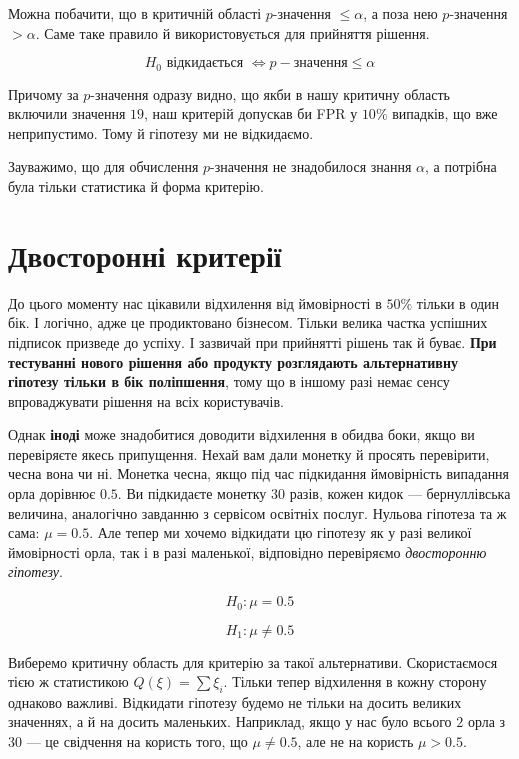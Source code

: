 \documentclass[
  letterpaper,
  10pt,
  openany]{report}
\theoremstyle{definition}
\theoremstyle{remark}
\begin{document}
Можна побачити, що в критичній області \(p\)-значення
\(\leqslant \alpha\), а поза нею \(p\)-значення \(> \alpha\). Саме таке
правило й використовується для прийняття рішення.

\[
H_0 \text{ відкидається } \Leftrightarrow p-значення \leqslant \alpha
\]

Причому за \(p\)-значення одразу видно, що якби в нашу критичну область
включили значення \(19\), наш критерій допускав би FPR у \(10\%\)
випадків, що вже неприпустимо. Тому й гіпотезу ми не відкидаємо.

Зауважимо, що для обчислення \(p\)-значення не знадобилося знання
\(\alpha\), а потрібна була тільки статистика й форма критерію.

\section{Двосторонні
критерії}\label{ux434ux432ux43eux441ux442ux43eux440ux43eux43dux43dux456-ux43aux440ux438ux442ux435ux440ux456ux457}

До цього моменту нас цікавили відхилення від ймовірності в \(50\%\)
тільки в один бік. І логічно, адже це продиктовано бізнесом. Тільки
велика частка успішних підписок призведе до успіху. І зазвичай при
прийнятті рішень так й буває. \textbf{При тестуванні нового рішення або
продукту розглядають альтернативну гіпотезу тільки в бік поліпшення},
тому що в іншому разі немає сенсу впроваджувати рішення на всіх
користувачів.

Однак \textbf{іноді} може знадобитися доводити відхилення в обидва боки,
якщо ви перевіряєте якесь припущення. Нехай вам дали монетку й просять
перевірити, чесна вона чи ні. Монетка чесна, якщо під час підкидання
ймовірність випадання орла дорівнює \(0.5\). Ви підкидаєте монетку
\(30\) разів, кожен кидок --- бернуллівська величина, аналогічно
завданню з сервісом освітніх послуг. Нульова гіпотеза та ж сама:
\(\mu = 0.5\). Але тепер ми хочемо відкидати цю гіпотезу як у разі
великої ймовірності орла, так і в разі маленької, відповідно перевіряємо
\emph{двосторонню гіпотезу}.

\[
H_0: \mu = 0.5
\]

\[
H_1: \mu \neq 0.5
\]

Виберемо критичну область для критерію за такої альтернативи.
Скористаємося тією ж статистикою \(Q(\xi) = \sum \xi_i\). Тільки тепер
відхилення в кожну сторону однаково важливі. Відкидати гіпотезу будемо
не тільки на досить великих значеннях, а й на досить маленьких.
Наприклад, якщо у нас було всього \(2\) орла з \(30\) --- це свідчення
на користь того, що \(\mu \neq 0.5\), але не на користь \(\mu > 0.5\).
\end{document}
